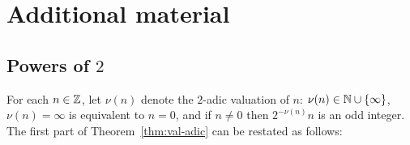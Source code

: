 
\section{Additional material}


  




\subsection{Powers of $2$}

For each $n \in \mathbb{Z}$, let $\nu(n)$ denote the $2$-adic valuation of $n$:
$\nu(n) \in \mathbb{N} \cup \{ \infty \}$,
$\nu(n) = \infty$ is equivalent to $n = 0$, and
if $n \ne 0$ then  $2^{- \nu(n)} n$ is an odd integer.
The first part of Theorem~\ref{thm:val-adic} can be restated as follows:

